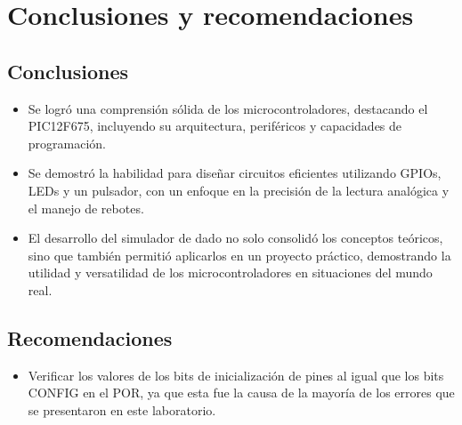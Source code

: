 \section{Conclusiones y recomendaciones}

\subsection{Conclusiones}
\begin{itemize}
    \item Se logró una comprensión sólida de los microcontroladores, destacando el PIC12F675, incluyendo su arquitectura, periféricos y capacidades de programación.
    \item Se demostró la habilidad para diseñar circuitos eficientes utilizando GPIOs, LEDs y un pulsador, con un enfoque en la precisión de la lectura analógica y el manejo de rebotes.
    \item     El desarrollo del simulador de dado no solo consolidó los conceptos teóricos, sino que también permitió aplicarlos en un proyecto práctico, demostrando la utilidad y versatilidad de los microcontroladores en situaciones del mundo real.
\end{itemize}

\subsection{Recomendaciones}
\begin{itemize}
    \item Verificar los valores de los bits de inicialización de pines al igual que los bits CONFIG en el POR, ya que esta fue la causa de la mayoría de los errores que se presentaron en este laboratorio.

\end{itemize}




